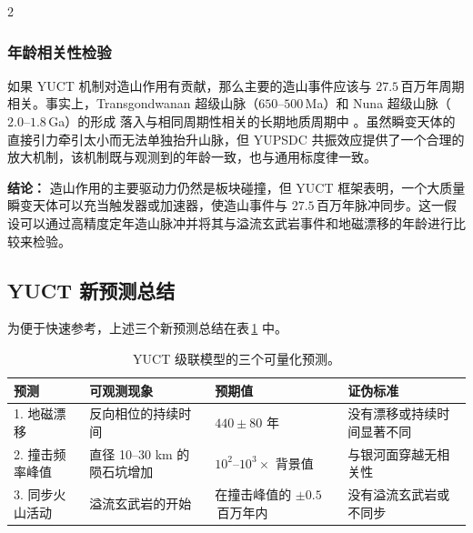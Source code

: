 \documentclass[11pt,a4paper]{article}
\begin{document}
\begin{multicols}{2}
		\subsubsection{年龄相关性检验}
		
		如果 YUCT 机制对造山作用有贡献，那么主要的造山事件应该与 \(27.5\) 百万年周期相关。事实上，Transgondwanan 超级山脉（\(650\)–\(500\) Ma）和 Nuna 超级山脉（\(2.0\)–\(1.8\) Ga）的形成 \cite{CampbellAllen2008} 落入与相同周期性相关的长期地质周期中 \cite{Rampino2021}。虽然瞬变天体的直接引力牵引太小而无法单独抬升山脉，但 YUPSDC 共振效应提供了一个合理的放大机制，该机制既与观测到的年龄一致，也与通用标度律一致。
		
		\vspace{0.3cm}
		\noindent
		\textbf{结论：} 造山作用的主要驱动力仍然是板块碰撞，但 YUCT 框架表明，一个大质量瞬变天体可以充当触发器或加速器，使造山事件与 \(27.5\) 百万年脉冲同步。这一假设可以通过高精度定年造山脉冲并将其与溢流玄武岩事件和地磁漂移的年龄进行比较来检验。
		
		\end{multicols}
		
		\subsection{YUCT 新预测总结}
		
		为便于快速参考，上述三个新预测总结在表 \ref{tab:new_predictions} 中。
		
		\begin{table}[H]
		\centering
		\small
		\caption{YUCT 级联模型的三个可量化预测。}
		\label{tab:new_predictions}
		\begin{tabular}{p{3.9cm} p{4.4cm} p{4.7cm} p{4.0cm}}
			\toprule
			\textbf{预测} & \textbf{可观测现象} & \textbf{预期值} & \textbf{证伪标准} \\
			\midrule
			1. 地磁漂移 & 反向相位的持续时间 & \(440 \pm 80\) 年 & 没有漂移或持续时间显著不同 \\
			2. 撞击频率峰值 & 直径 10–30 km 的陨石坑增加 & \(10^{2}\)–\(10^{3}\times\) 背景值 & 与银河面穿越无相关性 \\
			3. 同步火山活动 & 溢流玄武岩的开始 & 在撞击峰值的 \(\pm 0.5\) 百万年内 & 没有溢流玄武岩或不同步 \\
			\bottomrule
		\end{tabular}
		\end{table}
		
\end{document}
